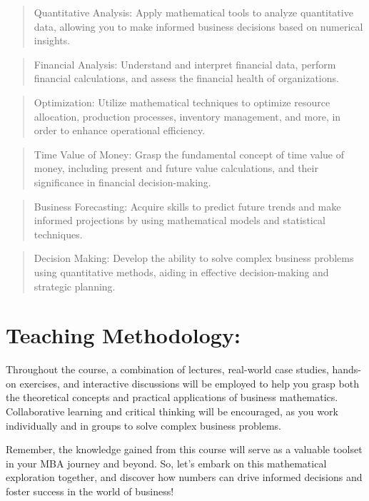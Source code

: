 \documentclass[
]{book}
\theoremstyle{definition}
\theoremstyle{definition}
\theoremstyle{definition}
\theoremstyle{definition}
\theoremstyle{remark}
\begin{document}
\begin{quote}
Quantitative Analysis: Apply mathematical tools to analyze quantitative data, allowing you to make informed business decisions based on numerical insights.
\end{quote}

\begin{quote}
Financial Analysis: Understand and interpret financial data, perform financial calculations, and assess the financial health of organizations.
\end{quote}

\begin{quote}
Optimization: Utilize mathematical techniques to optimize resource allocation, production processes, inventory management, and more, in order to enhance operational efficiency.
\end{quote}

\begin{quote}
Time Value of Money: Grasp the fundamental concept of time value of money, including present and future value calculations, and their significance in financial decision-making.
\end{quote}

\begin{quote}
Business Forecasting: Acquire skills to predict future trends and make informed projections by using mathematical models and statistical techniques.
\end{quote}

\begin{quote}
Decision Making: Develop the ability to solve complex business problems using quantitative methods, aiding in effective decision-making and strategic planning.
\end{quote}

\hypertarget{teaching-methodology}{%
\section{Teaching Methodology:}\label{teaching-methodology}}

Throughout the course, a combination of lectures, real-world case studies, hands-on exercises, and interactive discussions will be employed to help you grasp both the theoretical concepts and practical applications of business mathematics. Collaborative learning and critical thinking will be encouraged, as you work individually and in groups to solve complex business problems.

Remember, the knowledge gained from this course will serve as a valuable toolset in your MBA journey and beyond. So, let's embark on this mathematical exploration together, and discover how numbers can drive informed decisions and foster success in the world of business!
\end{document}
